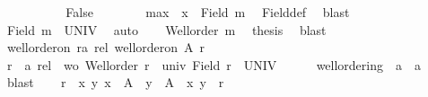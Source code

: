 \begin{isabellebody}
\ \ \ \ \isamarkupfalse%
\isanewline
%
\isanewline
\ \ \ \ \isamarkupfalse%
\ False\isanewline
\ \ \ \ \ \ \isamarkupfalse%
\ max\ \ {\isacartoucheopen}x\ {\isasymnotin}\ Field\ m{\isacartoucheclose}\ \isamarkupfalse%
\ Field{\isacharunderscore}{\kern0pt}def\ \isamarkupfalse%
\ blast\isanewline
\ \ \isamarkupfalse%
\isanewline
\ \ \isamarkupfalse%
\ \isamarkupfalse%
\ {\isachardoublequoteopen}Field\ m\ {\isacharequal}{\kern0pt}\ UNIV{\isachardoublequoteclose}\ \isamarkupfalse%
\ auto\isanewline
\ \ \isamarkupfalse%
\ {\isacartoucheopen}Well{\isacharunderscore}{\kern0pt}order\ m{\isacartoucheclose}\ \isamarkupfalse%
\ {\isacharquery}{\kern0pt}thesis\ \isamarkupfalse%
\ blast\isanewline
{}\isamarkupfalse%
%
\endisatagproof
{\isafoldproof}%
%
\isadelimproof
\isanewline
%
\endisadelimproof
\isanewline
{}\isamarkupfalse%
\ well{\isacharunderscore}{\kern0pt}order{\isacharunderscore}{\kern0pt}on{\isacharcolon}{\kern0pt}\ {\isachardoublequoteopen}{\isasymexists}r{\isacharcolon}{\kern0pt}{\isacharcolon}{\kern0pt}{\isacharprime}{\kern0pt}a\ rel{\isachardot}{\kern0pt}\ well{\isacharunderscore}{\kern0pt}order{\isacharunderscore}{\kern0pt}on\ A\ r{\isachardoublequoteclose}\isanewline
%
\isadelimproof
%
\endisadelimproof
%
\isatagproof
{}\isamarkupfalse%
\ {\isacharminus}{\kern0pt}\isanewline
\ \ \isamarkupfalse%
\ r\ {\isacharcolon}{\kern0pt}{\isacharcolon}{\kern0pt}\ {\isachardoublequoteopen}{\isacharprime}{\kern0pt}a\ rel{\isachardoublequoteclose}\ \ wo{\isacharcolon}{\kern0pt}\ {\isachardoublequoteopen}Well{\isacharunderscore}{\kern0pt}order\ r{\isachardoublequoteclose}\ \ univ{\isacharcolon}{\kern0pt}\ {\isachardoublequoteopen}Field\ r\ {\isacharequal}{\kern0pt}\ UNIV{\isachardoublequoteclose}\isanewline
\ \ \ \ \isamarkupfalse%
\ well{\isacharunderscore}{\kern0pt}ordering\ {\isacharbrackleft}{\kern0pt}\ {\isacharprime}{\kern0pt}a\ {\isacharequal}{\kern0pt}\ {\isachardoublequoteopen}{\isacharprime}{\kern0pt}a{\isachardoublequoteclose}{\isacharbrackright}{\kern0pt}\ \isamarkupfalse%
\ blast\isanewline
\ \ \isamarkupfalse%
\ {\isacharquery}{\kern0pt}r\ {\isacharequal}{\kern0pt}\ {\isachardoublequoteopen}{\isacharbraceleft}{\kern0pt}{\isacharparenleft}{\kern0pt}x{\isacharcomma}{\kern0pt}\ y{\isacharparenright}{\kern0pt}{\isachardot}{\kern0pt}\ x\ {\isasymin}\ A\ {\isasymand}\ y\ {\isasymin}\ A\ {\isasymand}\ {\isacharparenleft}{\kern0pt}x{\isacharcomma}{\kern0pt}\ y{\isacharparenright}{\kern0pt}\ {\isasymin}\ r{\isacharbraceright}{\kern0pt}{\isachardoublequoteclose}\isanewline

\end{isabellebody}
